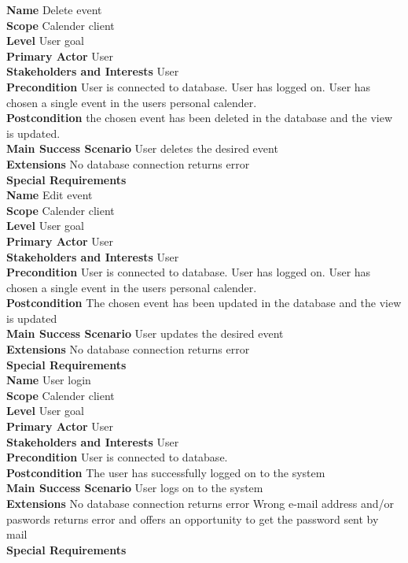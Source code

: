 \documentclass[a4paper,10pt,titlepage]{article}
\begin{document}
	\textbf{Name}
	Delete event
	\\
	\textbf{Scope}
	Calender client
	\\
	\textbf{Level}
	User goal
	\\
	\textbf{Primary Actor}
	User
	\\
	\textbf{Stakeholders and Interests}
	User
	\\
	\textbf{Precondition}
	User is connected to database.
	User has logged on.
	User has chosen a single event in the users personal calender.
	\\
	\textbf{Postcondition}
	the chosen event has been deleted in the database and the view is updated.
	\\
	\textbf{Main Success Scenario}
	User deletes the desired event
	\\
	\textbf{Extensions}
	No database connection returns error
	\\
	\textbf{Special Requirements}
	\\
	
	\textbf{Name}
	Edit event
	\\
	\textbf{Scope}
	Calender client
	\\
	\textbf{Level}
	User goal
	\\
	\textbf{Primary Actor}
	User
	\\
	\textbf{Stakeholders and Interests}
	User
	\\
	\textbf{Precondition}
	User is connected to database.
	User has logged on.
	User has chosen a single event in the users personal calender.
	\\
	\textbf{Postcondition}
	The chosen event has been updated in the database and the view is updated
	\\
	\textbf{Main Success Scenario}
	User updates the desired event
	\\
	\textbf{Extensions}
	No database connection returns error
	\\
	\textbf{Special Requirements}
	\\
	
	\textbf{Name}
	User login
	\\
	\textbf{Scope}
	Calender client
	\\
	\textbf{Level}
	User goal
	\\
	\textbf{Primary Actor}
	User
	\\
	\textbf{Stakeholders and Interests}
	User
	\\
	\textbf{Precondition}
	User is connected to database.
	\\
	\textbf{Postcondition}
	The user has successfully logged on to the system
	\\
	\textbf{Main Success Scenario}
	User logs on to the system
	\\
	\textbf{Extensions}
	No database connection returns error
	Wrong e-mail address and/or paswords returns error and offers an opportunity to get the password sent by mail
	\\
	\textbf{Special Requirements}
	\\
	
\end{document}
